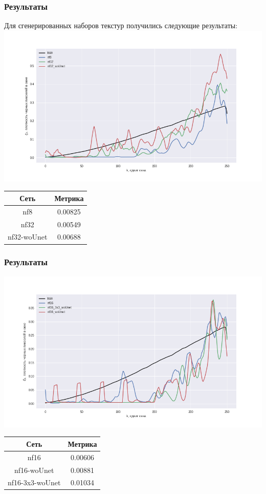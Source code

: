 \documentclass[9pt]{beamer}
\begin{document}
\begin{frame}\frametitle{Результаты}
	Для сгенерированных наборов текстур получились следующие результаты:
	\includegraphics[width=0.95\linewidth,height=0.5\textwidth]{tr_1}
	\begin{table}[h]
		\begin{tabular}{|c|c|}
			\hline
			Сеть & Метрика \\
			\hline
			nf8 & 0.00825\\
			\hline
			nf32 & 0.00549\\
			\hline
			nf32-woUnet & 0.00688\\
			\hline
		\end{tabular}
	\end{table}
\end{frame}

\begin{frame}\frametitle{Результаты}
	\includegraphics[width=0.95\linewidth,height=0.5\textwidth]{tr_2}
	\begin{table}[h]
		\begin{tabular}{|c|c|}
			\hline
			Сеть & Метрика \\
			\hline
			nf16 & 0.00606\\
			\hline
			nf16-woUnet & 0.00881\\
			\hline
			nf16-3x3-woUnet & 0.01034\\
			\hline
		\end{tabular}
	\end{table}
\end{frame}
\end{document}
